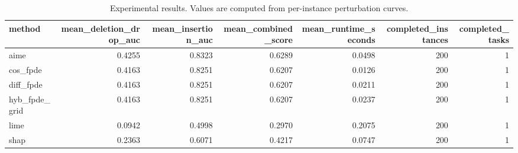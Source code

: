 \begin{table}[t]
\caption{Experimental results. Values are computed from per-instance perturbation curves.}
\label{tab:main_results_computed}
\centering
\begin{tabular}{lrrrrrr}
\toprule
method & mean\_deletion\_drop\_auc & mean\_insertion\_auc & mean\_combined\_score & mean\_runtime\_seconds & completed\_instances & completed\_tasks \\
\midrule
aime & 0.4255 & 0.8323 & 0.6289 & 0.0498 & 200 & 1 \\
cos\_fpde & 0.4163 & 0.8251 & 0.6207 & 0.0126 & 200 & 1 \\
diff\_fpde & 0.4163 & 0.8251 & 0.6207 & 0.0211 & 200 & 1 \\
hyb\_fpde\_grid & 0.4163 & 0.8251 & 0.6207 & 0.0237 & 200 & 1 \\
lime & 0.0942 & 0.4998 & 0.2970 & 0.2075 & 200 & 1 \\
shap & 0.2363 & 0.6071 & 0.4217 & 0.0747 & 200 & 1 \\
\bottomrule
\end{tabular}

\end{table}
